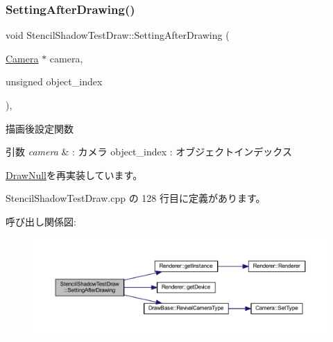\subsubsection{\texorpdfstring{Setting\+After\+Drawing()}{SettingAfterDrawing()}}
{\footnotesize\ttfamily void Stencil\+Shadow\+Test\+Draw\+::\+Setting\+After\+Drawing (\begin{DoxyParamCaption}\item[{\mbox{\hyperlink{class_camera}{Camera}} $\ast$}]{camera,  }\item[{unsigned}]{object\+\_\+index }\end{DoxyParamCaption})\hspace{0.3cm}{\ttfamily [override]}, {\ttfamily [virtual]}}



描画後設定関数 


\begin{DoxyParams}{引数}
{\em camera} & \+: カメラ object\+\_\+index \+: オブジェクトインデックス \\
\hline
\end{DoxyParams}


\mbox{\hyperlink{class_draw_null_a76edfc5af0bf3275f96f40394aff8510}{Draw\+Null}}を再実装しています。



 Stencil\+Shadow\+Test\+Draw.\+cpp の 128 行目に定義があります。

呼び出し関係図\+:
\nopagebreak
\begin{figure}[H]
\begin{center}
\leavevmode
\includegraphics[width=350pt]{class_stencil_shadow_test_draw_a68917115d3f151ed91ce297924ee5bbb_cgraph}
\end{center}
\end{figure}
\mbox{\label{class_stencil_shadow_test_draw_a0f697b6dad67048c7f8916a53cca6b1c}} 
